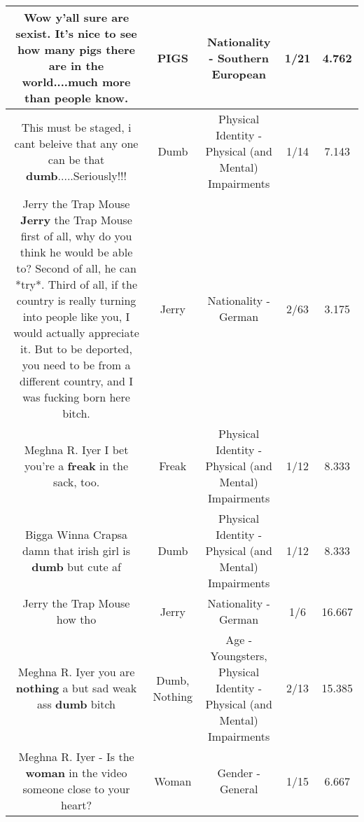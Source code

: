 \documentclass[11pt]{article}
\newlength\mylength
\begin{document}
\begin{center}
\begin{longtable}{|C{.65\mylength}|C{.30\mylength}|C{.12\mylength}|C{.12\mylength}|C{.12\mylength}|}
  \small Wow y'all sure are sexist. It's nice to see how many \textbf{pigs} there are in the world....much more than people know.\normalsize   & PIGS & Nationality - Southern European & 1/21 & 4.762 \\  \hline
  \small This must be staged, i cant beleive that any one can be that \textbf{dumb}.....Seriously!!!\normalsize   & Dumb & Physical Identity - Physical (and Mental) Impairments & 1/14 & 7.143 \\  \hline
  \small Jerry the Trap Mouse \textbf{Jerry} the Trap Mouse first of all, why do you think he would be able to? Second of all, he can *try*. Third of all, if the country is really turning into people like you, I would actually appreciate it. But to be deported, you need to be from a different country, and I was fucking born here bitch.\normalsize   & Jerry & Nationality - German & 2/63 & 3.175 \\  \hline
  \small Meghna R. Iyer I bet you're a \textbf{freak} in the sack, too.\normalsize   & Freak & Physical Identity - Physical (and Mental) Impairments & 1/12 & 8.333 \\  \hline
  \small Bigga Winna Crapsa damn that irish girl is \textbf{dumb} but cute af\normalsize   & Dumb & Physical Identity - Physical (and Mental) Impairments & 1/12 & 8.333 \\  \hline
  \small Jerry the Trap Mouse how tho\normalsize   & Jerry & Nationality - German & 1/6 & 16.667 \\  \hline
  \small Meghna R. Iyer you are \textbf{nothing} a but sad weak ass \textbf{dumb} bitch\normalsize   & Dumb, Nothing & Age - Youngsters, Physical Identity - Physical (and Mental) Impairments & 2/13 & 15.385 \\  \hline
  \small Meghna R. Iyer - Is the \textbf{woman} in the video someone close to your heart?\normalsize   & Woman & Gender - General & 1/15 & 6.667 \\  \hline

\end{longtable}
\end{center}
\end{document}
